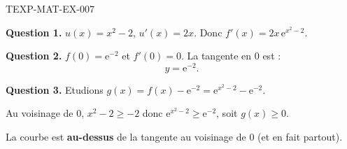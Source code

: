 \begin{corrige}{TEXP-MAT-EX-007}

\textbf{Question 1.} $u(x) = x^2-2$, $u'(x) = 2x$. Donc $f'(x) = 2x\,\mathrm{e}^{x^2-2}$.


\textbf{Question 2.} $f(0) = \mathrm{e}^{-2}$ et $f'(0) = 0$. La tangente en $0$ est :
\[ y = \mathrm{e}^{-2}. \]

\textbf{Question 3.} Etudions $g(x) = f(x) - \mathrm{e}^{-2} = \mathrm{e}^{x^2-2} - \mathrm{e}^{-2}$.

Au voisinage de $0$, $x^2-2 \geq -2$ donc $\mathrm{e}^{x^2-2} \geq \mathrm{e}^{-2}$, soit $g(x) \geq 0$.

La courbe est \textbf{au-dessus} de la tangente au voisinage de $0$ (et en fait partout).

\end{corrige}
